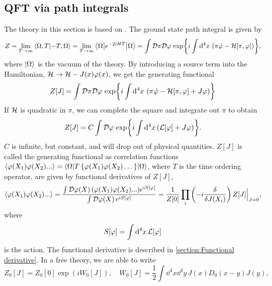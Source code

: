\label{Free energy and the effective action}
\subsection{QFT via path integrals}
\label{section:path integral}
The theory in this section is based on \cite{Peskin:IntroQFT,weinberg_1995,weinberg_1996_vol2,Schwartz:QFT}.
The ground state path integral is given by
\begin{equation}
    Z = \lim_{T\rightarrow \infty} \braket{\Omega, T}{-T, \Omega}
    = \lim_{T\rightarrow \infty} \left\langle \Omega {\left|  e^{-2iHT}  \right|} \Omega \right\rangle
    = \int \mathcal{D} \pi \mathcal{D} \varphi \, \exp{ i \int \dd^4 x \, \left(\pi \dot \varphi - \mathcal{H}[\pi, \varphi]\right) },
\end{equation}
where $\ket{\Omega}$ is the vacuum of the theory.
By introducing a source term into the Hamiltonian, $\mathcal{H} \rightarrow \mathcal{H} - J(x)\varphi(x)$, we get the generating functional
\begin{equation}
    Z[J] = 
    \int \mathcal{D} \pi \mathcal{D} \varphi \, 
    \exp{ i \int \dd^4 x \, \left(\pi \dot \varphi - \mathcal{H}[\pi, \varphi]+ J\varphi\right) }
\end{equation}
If $\mathcal{H}$ is quadratic in $\pi$, we can complete the square and integrate out $\pi$ to obtain
\begin{equation}
    Z[J] = C \int \mathcal{D} \varphi \, \exp{i \int \dd^4 x\, (\mathcal{L}[\varphi] + J \varphi)}.
\end{equation}
$C$ is infinite, but constant, and will drop out of physical quantities.
$Z[J]$ is called the generating functional as correlation functions $\ex{\varphi(X_1)\varphi(X_2)...} = \inner{\Omega}{T\left\{\varphi(X_1)\varphi(X_2)\dots\right\}}{\Omega}$, where $T$ is the time ordering operator, are given by functional derivatives of $Z[J]$, 
\begin{equation}
    \label{correlator from generating functional}
    \ex{\varphi(X_1)\varphi(X_2)...}
    = 
    \frac{\int \D \varphi(X)\,  (\varphi(X_1)\varphi(X_2)...) e^{i S[\varphi]}}
        {\int \D \varphi(X)\, e^{i S[\varphi]}}
    =
    \frac{1}{Z[0]} \prod_i\left( -i  \fdv{J(X_i)}\right) Z[J]\Big|_{J = 0},
\end{equation}
where 
\begin{equation}
    S[\varphi] = \int \dd^4 x \, \mathcal{L}[\varphi]
\end{equation}
is the action.
The functional derivative is described in \autoref{section:Functional derivative}.
In a free theory, we are able to write
\begin{equation}
    Z_0[J] = Z_0[0] \exp(i W_0[J]), \quad 
    W_0[J] = \frac{1}{2} \int \dd^4 x \dd^4 y \, J(x) D_0(x - y) J(y),
\end{equation}
